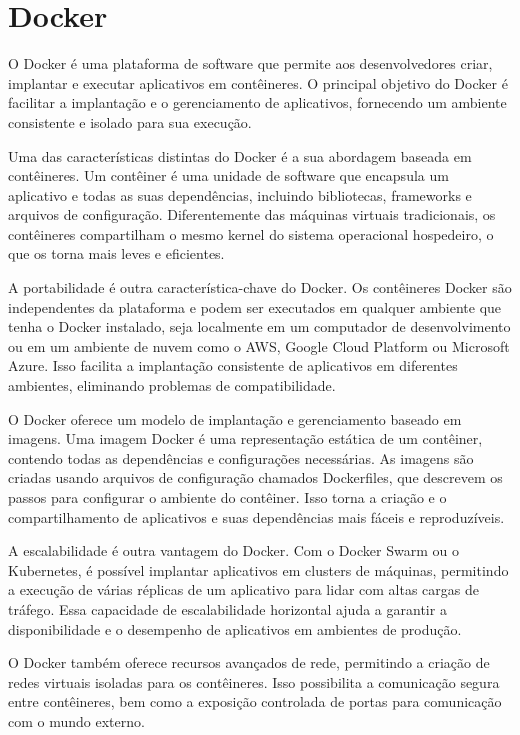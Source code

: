 \section{Docker}

O Docker é uma plataforma de software que permite aos desenvolvedores criar, implantar e executar aplicativos em contêineres. O principal objetivo do Docker é facilitar a implantação e o gerenciamento de aplicativos, fornecendo um ambiente consistente e isolado para sua execução.

Uma das características distintas do Docker é a sua abordagem baseada em contêineres. Um contêiner é uma unidade de software que encapsula um aplicativo e todas as suas dependências, incluindo bibliotecas, frameworks e arquivos de configuração. Diferentemente das máquinas virtuais tradicionais, os contêineres compartilham o mesmo kernel do sistema operacional hospedeiro, o que os torna mais leves e eficientes.

A portabilidade é outra característica-chave do Docker. Os contêineres Docker são independentes da plataforma e podem ser executados em qualquer ambiente que tenha o Docker instalado, seja localmente em um computador de desenvolvimento ou em um ambiente de nuvem como o AWS, Google Cloud Platform ou Microsoft Azure. Isso facilita a implantação consistente de aplicativos em diferentes ambientes, eliminando problemas de compatibilidade.

O Docker oferece um modelo de implantação e gerenciamento baseado em imagens. Uma imagem Docker é uma representação estática de um contêiner, contendo todas as dependências e configurações necessárias. As imagens são criadas usando arquivos de configuração chamados Dockerfiles, que descrevem os passos para configurar o ambiente do contêiner. Isso torna a criação e o compartilhamento de aplicativos e suas dependências mais fáceis e reproduzíveis.

A escalabilidade é outra vantagem do Docker. Com o Docker Swarm ou o Kubernetes, é possível implantar aplicativos em clusters de máquinas, permitindo a execução de várias réplicas de um aplicativo para lidar com altas cargas de tráfego. Essa capacidade de escalabilidade horizontal ajuda a garantir a disponibilidade e o desempenho de aplicativos em ambientes de produção.

O Docker também oferece recursos avançados de rede, permitindo a criação de redes virtuais isoladas para os contêineres. Isso possibilita a comunicação segura entre contêineres, bem como a exposição controlada de portas para comunicação com o mundo externo.
